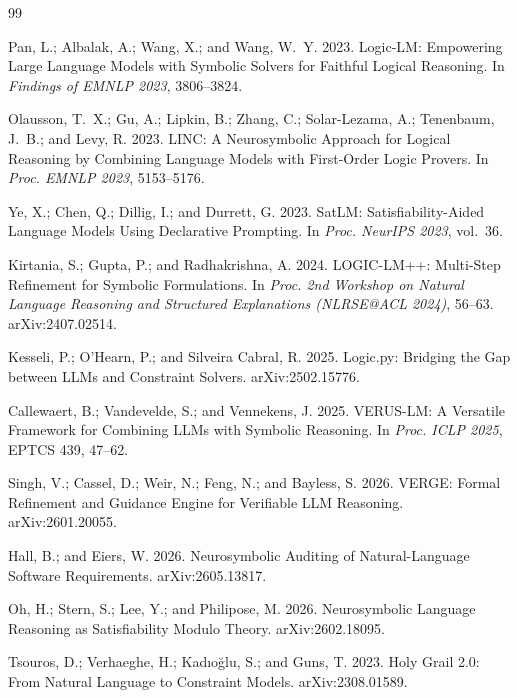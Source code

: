 \documentclass[letterpaper]{article}
\begin{document}
\begin{thebibliography}{99}

Pan, L.; Albalak, A.; Wang, X.; and Wang, W.~Y. 2023.
Logic-LM: Empowering Large Language Models with Symbolic Solvers for Faithful Logical Reasoning.
In \textit{Findings of EMNLP 2023}, 3806--3824.

Olausson, T.~X.; Gu, A.; Lipkin, B.; Zhang, C.; Solar-Lezama, A.; Tenenbaum, J.~B.; and Levy, R. 2023.
LINC: A Neurosymbolic Approach for Logical Reasoning by Combining Language Models with First-Order Logic Provers.
In \textit{Proc. EMNLP 2023}, 5153--5176.

Ye, X.; Chen, Q.; Dillig, I.; and Durrett, G. 2023.
SatLM: Satisfiability-Aided Language Models Using Declarative Prompting.
In \textit{Proc. NeurIPS 2023}, vol.~36.

Kirtania, S.; Gupta, P.; and Radhakrishna, A. 2024.
LOGIC-LM++: Multi-Step Refinement for Symbolic Formulations.
In \textit{Proc. 2nd Workshop on Natural Language Reasoning and Structured
Explanations (NLRSE@ACL 2024)}, 56--63. arXiv:2407.02514.

Kesseli, P.; O'Hearn, P.; and Silveira Cabral, R. 2025.
Logic.py: Bridging the Gap between LLMs and Constraint Solvers.
arXiv:2502.15776.

Callewaert, B.; Vandevelde, S.; and Vennekens, J. 2025.
VERUS-LM: A Versatile Framework for Combining LLMs with Symbolic Reasoning.
In \textit{Proc. ICLP 2025}, EPTCS 439, 47--62.

Singh, V.; Cassel, D.; Weir, N.; Feng, N.; and Bayless, S. 2026.
VERGE: Formal Refinement and Guidance Engine for Verifiable LLM Reasoning.
arXiv:2601.20055.

Hall, B.; and Eiers, W. 2026.
Neurosymbolic Auditing of Natural-Language Software Requirements.
arXiv:2605.13817.

Oh, H.; Stern, S.; Lee, Y.; and Philipose, M. 2026.
Neurosymbolic Language Reasoning as Satisfiability Modulo Theory.
arXiv:2602.18095.

Tsouros, D.; Verhaeghe, H.; Kad{\i}o\u{g}lu, S.; and Guns, T. 2023.
Holy Grail 2.0: From Natural Language to Constraint Models.
arXiv:2308.01589.


\end{thebibliography}
\end{document}
